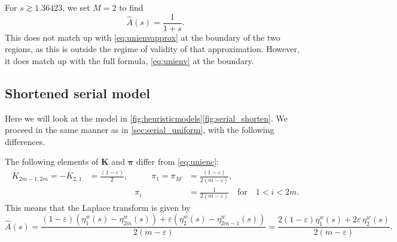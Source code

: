 \documentclass[12pt]{article}
\newcommand{\eqm}{\pi}
\newcommand{\eq}{\boldsymbol{\eqm}}
\newcommand{\etwm}{\eta^w}
\newcommand{\encm}{K}
\newcommand{\enc}{\mathbf{\encm}}
\begin{document}
For \(s\gtrsim 1.36423\), we set \(M=2\) to find
%
\begin{equation}\label{eq:binaryenv}
  \hat{A}(s) = \frac{1}{1+s}.
\end{equation}
%
This does not match up with \eqref{eq:unienvapprox} at the boundary of the two regions, as this is outside the regime of validity of that approximation.
However, it does match up with the full formula, \eqref{eq:unienv} at the boundary.


\subsection{Shortened serial model}\label{sec:serial_shorten}


Here we will look at the model in \cref{fig:heuristicmodels}\ref{fig:serial_shorten}.
We proceed in the same manner as in \cref{sec:serial_uniform}, with the following differences.

The following elements of \(\enc\) and \(\eq\) differ from \eqref{eq:unienc}:
%
\begin{equation}\label{eq:shortenenc}
  \begin{aligned}
  \encm_{2m-1,2m} = -\encm_{2,1} &= \frac{(1-\varepsilon)}{2},
  &\qquad
  \eqm_1 = \eqm_M &= \frac{(1-\varepsilon)}{2(m-\varepsilon)},
  \\ &&
  \eqm_i &=  \frac{1}{2(m-\varepsilon)}
  \quad\text{for}\quad 1<i<2m.
  \end{aligned}
\end{equation}
%
This means that the Laplace transform is given by
%
\begin{equation}\label{eq:shortenareaeta}
  \hat{A}(s) = \frac{(1-\varepsilon)(\etwm_1(s)-\etwm_{2m}(s)) 
                      + \varepsilon(\etwm_2(s)-\etwm_{2m-1}(s))}
                    {2(m-\varepsilon)}
       = \frac{2(1-\varepsilon) \etwm_1(s) + 2\varepsilon\,\etwm_2(s)}
              {2(m-\varepsilon)}.
\end{equation}
%
\end{document}
